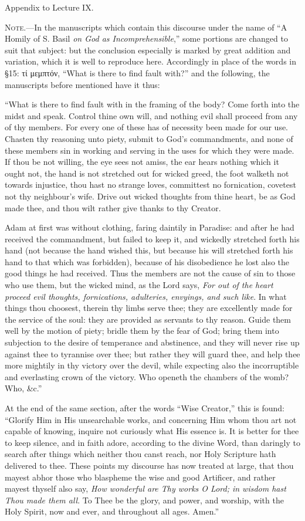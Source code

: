 Appendix to Lecture IX.

\textsc{Note}.—In the manuscripts which contain this discourse under the name of “A Homily of S. Basil \emph{on God as Incomprehensible},” some portions are changed to suit that subject: but the conclusion especially is marked by great addition and variation, which it is well to reproduce here. Accordingly in place of the words in §15: \textgreek{τί μεμπτόν}, “What is there to find fault with?” and the following, the manuscripts before mentioned have it thus:

“What is there to find fault with in the framing of the body? Come forth into the midst and speak. Control thine own will, and nothing evil shall proceed from any of thy members. For every one of these has of necessity been made for our use. Chasten thy reasoning unto piety, submit to God’s commandments, and none of these members sin in working and serving in the uses for which they were made. If thou be not willing, the eye sees not amiss, the ear hears nothing which it ought not, the hand is not stretched out for wicked greed, the foot walketh not towards injustice, thou hast no strange loves, committest no fornication, covetest not thy neighbour’s wife. Drive out wicked thoughts from thine heart, be as God made thee, and thou wilt rather give thanks to thy Creator.

Adam at first was without clothing, faring daintily in Paradise: and after he had received the commandment, but failed to keep it, and wickedly stretched forth his hand (not because the hand wished this, but because his will stretched forth his hand to that which was forbidden), because of his disobedience he lost also the good things he had received. Thus the members are not the cause of sin to those who use them, but the wicked mind, as the Lord says, \emph{For out of the heart proceed evil thoughts, fornications, adulteries, envyings, and such like}. In what things thou choosest, therein thy limbs serve thee; they are excellently made for the service of the soul: they are provided as servants to thy reason. Guide them well by the motion of piety; bridle them by the fear of God; bring them into subjection to the desire of temperance and abstinence, and they will never rise up against thee to tyrannise over thee; but rather they will guard thee, and help thee more mightily in thy victory over the devil, while expecting also the incorruptible and everlasting crown of the victory. Who openeth the chambers of the womb? Who, \&c.”

At the end of the same section, after the words “Wise Creator,” this is found: “Glorify Him in His unsearchable works, and concerning Him whom thou art not capable of knowing, inquire not curiously what His essence is. It is better for thee to keep silence, and in faith adore, according to the divine Word, than daringly to search after things which neither thou canst reach, nor Holy Scripture hath delivered to thee. These points my discourse has now treated at large, that thou mayest abhor those who blaspheme the wise and good Artificer, and rather mayest thyself also say, \emph{How wonderful are Thy works O Lord; in wisdom hast Thou made them all}. To Thee be the glory, and power, and worship, with the Holy Spirit, now and ever, and throughout all ages. Amen.”

